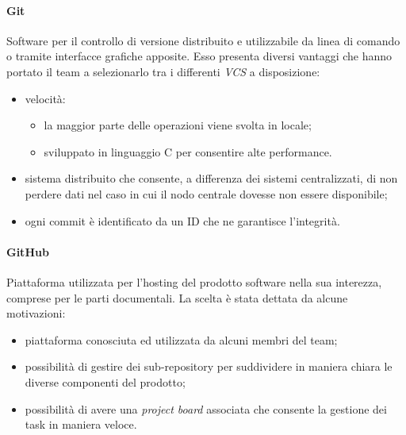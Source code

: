 \paragraph{Git}
Software per il controllo di versione distribuito e utilizzabile da linea di comando o tramite interfacce grafiche apposite. Esso presenta diversi vantaggi che hanno portato il team a selezionarlo tra i differenti \textit{VCS\glo} a disposizione:
\begin{itemize}
	\item velocità:
	\begin{itemize}
		\item la maggior parte delle operazioni viene svolta in locale;
		\item sviluppato in linguaggio C per consentire alte performance.
	\end{itemize}
	\item sistema distribuito che consente, a differenza dei sistemi centralizzati, di non perdere dati nel caso in cui il nodo centrale dovesse non essere disponibile;
	\item ogni commit è identificato da un ID che ne garantisce l'integrità.
\end{itemize}


\paragraph{GitHub}
Piattaforma utilizzata per l'hosting del prodotto software nella sua interezza, comprese per le parti documentali. La scelta è stata dettata da alcune motivazioni:
\begin{itemize}
	\item piattaforma conosciuta ed utilizzata da alcuni membri del team;
	\item possibilità di gestire dei sub-repository per suddividere in maniera chiara le diverse componenti del prodotto;
	\item possibilità di avere una \textit{project board\glo} associata che consente la gestione dei task in maniera veloce.
\end{itemize}
